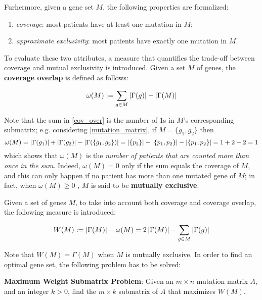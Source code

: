 Furhermore, given a gene set $M$, the following properties are formalized:

\begin{enumerate}[label=\roman*), font=\itshape]
    \item \textit{coverage}: most patients have at least one mutation in $M$;
    \item \textit{approximate exclusivity}: most patients have exactly one mutation in $M$.
\end{enumerate}

To evaluate these two attributes, a measure that quantifies the trade-off between coverage and mutual exclusivity is introduced. Given a set $M$ of genes, the \textbf{coverage overlap} is defined as follows:

\begin{equation}\label{cov_over}
    \omega(M) := \sum_{g \in M}{\left|\Gamma(g)\right|} - \left|\Gamma(M)\right|
\end{equation}

Note that the sum in \cref{cov_over} is the number of 1s in $M$'s corresponding submatrix; e.g. considering \cref{mutation_matrix}, if $M=\{g_1, g_2\}$ then $$\omega(M)=\left|\Gamma(g_1)\right| + \left|\Gamma(g_2)\right| - \left|\Gamma(\{g_1, g_2\})\right| = \left|\{p_2\}\right| + \left|\{p_1, p_2\}\right| - \left|\{p_1, p_2\}\right| = 1 + 2 - 2 = 1$$ which shows that $\omega(M)$ is the \textit{number of patients that are counted more than once in the sum}. Indeed, $\omega(M) = 0$ only if the sum equals the coverage of $M$, and this can only happen if no patient has more than one mutated gene of $M$; in fact, when $\omega(M) \ge 0$ , $M$ is said to be \textbf{mutually exclusive}.

Given a set of genes $M$, to take into account both coverage and coverage overlap, the following measure is introduced:

\begin{equation}\label{weight}
    W(M): = \left|\Gamma(M)\right| - \omega(M) = 2 \left|\Gamma(M)\right| - \sum_{g \in M} {\left|\Gamma(g)\right|}
\end{equation}

Note that $W(M) = \Gamma(M)$ when $M$ is mutually exclusive. In order to find an optimal gene set, the following problem has to be solved:

\begin{displayquote}\label{mwsp}
    \textbf{Maximum Weight Submatrix Problem}: Given an $m \times n$ mutation matrix $A$, and an integer $k > 0$, find the $m \times k$ submatrix of $A$ that maximizes $W(M)$.
\end{displayquote}

